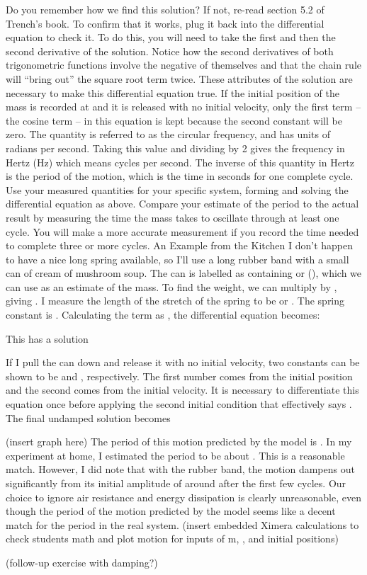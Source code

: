 \documentclass{ximera}
\begin{document}
Do you remember how we find this solution?  If not, re-read section 5.2 of Trench’s book.  To confirm that it works, plug it back into the differential equation to check it.  To do this, you will need to take the first and then the second derivative of the solution.  Notice how the second derivatives of both trigonometric functions involve the negative of themselves and that the chain rule will “bring out” the square root term twice.  These attributes of the solution are necessary to make this differential equation true.
If the initial position of the mass is recorded at  and it is released with no initial velocity, only the first term – the cosine term – in this equation is kept because the second constant will be zero.  
The quantity  is referred to as the circular frequency, and has units of radians per second.  Taking this value and dividing by 2 gives the frequency in Hertz (Hz) which means cycles per second.  The inverse of this quantity in Hertz is the period of the motion, which is the time in seconds for one complete cycle.
Use your measured quantities for your specific system, forming and solving the differential equation as above.  Compare your estimate of the period to the actual result by measuring the time the mass takes to oscillate through at least one cycle.  You will make a more accurate measurement if you record the time needed to complete three or more cycles.
An Example from the Kitchen
I don’t happen to have a nice long spring available, so I’ll use a long rubber band with a small can of cream of mushroom soup.  The can is labelled as containing or (), which we can use as an estimate of the mass.  To find the weight, we can multiply  by , giving .  I measure the length of the stretch of the spring to be  or .  The spring constant  is .  Calculating the  term as , the differential equation becomes:

This has a solution 

If I pull the can down  and release it with no initial velocity, two constants can be shown to be  and , respectively.  The first number comes from the initial position and the second comes from the initial velocity.  It is necessary to differentiate this equation once before applying the second initial condition that effectively says .  The final undamped solution becomes

(insert graph here)
The period of this motion predicted by the model is .  In my experiment at home, I estimated the period to be about .  This is a reasonable match.  However, I did note that with the rubber band, the motion dampens out significantly from its initial amplitude of around  after the first few cycles.  Our choice to ignore air resistance and energy dissipation is clearly unreasonable, even though the period of the motion predicted by the model seems like a decent match for the period in the real system.
(insert embedded Ximera calculations to check students math and plot motion for inputs of m,  , and initial positions)


(follow-up exercise with damping?)
\end{document}
